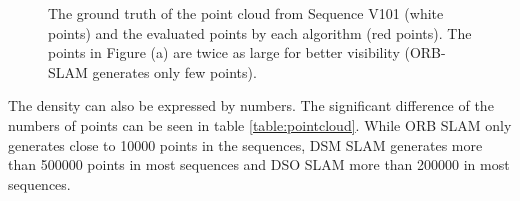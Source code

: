 	\begin{figure}%
    \centering
    \qquad
	\qquad
    \caption{The ground truth of the point cloud from Sequence V101 (white points) and the evaluated points by each algorithm (red points). 
	The points in Figure (a) are twice as large for better visibility (ORB-SLAM generates only few points). 
	}%
    \label{fig:pointcloud}%
	\end{figure}
	
	
	The density can also be expressed by numbers. The significant difference of the numbers of points can be seen in table \ref{table:pointcloud}. While 
	ORB SLAM only generates close to 10000 points in the sequences, DSM SLAM generates more than 500000 points in most sequences and DSO SLAM more than 200000 
	in most sequences. 
	
